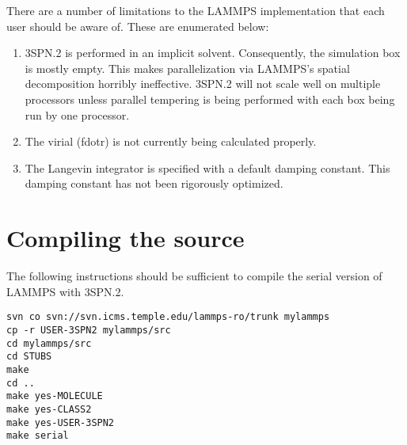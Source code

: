 \documentclass[11pt]{amsart}
\begin{document}
There are a number of limitations to the LAMMPS implementation that each user
should be aware of.  These are enumerated below:
\begin{enumerate}
\item 3SPN.2 is performed in an implicit solvent.  Consequently, the simulation
box is mostly empty.  This makes parallelization via LAMMPS's spatial
decomposition horribly ineffective.  3SPN.2 will not scale well on multiple
processors unless parallel tempering is being performed with each box being run
by one processor.
\item The virial (fdotr) is not currently being calculated properly.
\item The Langevin integrator is specified with a default damping constant.
This damping constant has not been rigorously optimized.
\end{enumerate}

\section{Compiling the source}\label{Compile}

The following instructions should be sufficient to compile the serial version
of LAMMPS with 3SPN.2.

\begin{verbatim}
svn co svn://svn.icms.temple.edu/lammps-ro/trunk mylammps
cp -r USER-3SPN2 mylammps/src
cd mylammps/src
cd STUBS
make
cd ..
make yes-MOLECULE
make yes-CLASS2
make yes-USER-3SPN2
make serial
\end{verbatim}
\end{document}
